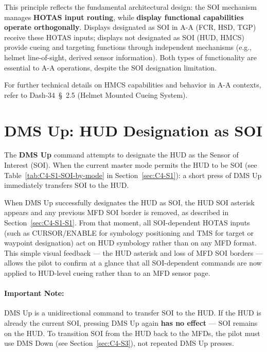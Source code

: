 \documentclass[11pt, a4paper, twoside]{report}
\providecommand{\dashref}[1]{Dash-34~\S~#1}
\begin{document}
This principle reflects the fundamental architectural design: the SOI mechanism manages \textbf{HOTAS input routing}, while \textbf{display functional capabilities operate orthogonally}. Displays designated as SOI in A-A (FCR, HSD, TGP) receive these HOTAS inputs; displays not designated as SOI (HUD, HMCS) provide cueing and targeting functions through independent mechanisms (e.g., helmet line-of-sight, derived sensor information). Both types of functionality are essential to A-A operations, despite the SOI designation limitation.

For further technical details on HMCS capabilities and behavior in A-A contexts, refer to \dashref{2.5} (Helmet Mounted Cueing System).

\section{DMS Up: HUD Designation as SOI}
\label{sec:C4-S2}

The \textbf{DMS Up} command attempts to designate the HUD as the Sensor of Interest (SOI). When the current master mode permits the HUD to be SOI (see Table~\ref{tab:C4-S1-SOI-by-mode} in Section~\ref{sec:C4-S1}): a short press of DMS Up immediately transfers SOI to the HUD.

When DMS Up successfully designates the HUD as SOI, the HUD SOI asterisk appears and any previous MFD SOI border is removed, as described in Section~\ref{sec:C4-S1-S1}. From that moment, all SOI-dependent HOTAS inputs (such as CURSOR/ENABLE for symbology positioning and TMS for target or waypoint designation) act on HUD symbology rather than on any MFD format. This simple visual feedback --- the HUD asterisk and loss of MFD SOI borders --- allows the pilot to confirm at a glance that all SOI-dependent commands are now applied to HUD-level cueing rather than to an MFD sensor page.

\paragraph*{Important Note:}

DMS Up is a unidirectional command to transfer SOI to the HUD. If the HUD is already the current SOI, pressing DMS Up again \textbf{has no effect} --- SOI remains on the HUD. To transition SOI from the HUD back to the MFDs, the pilot must use DMS Down (see Section~\ref{sec:C4-S3}), not repeated DMS Up presses.
\end{document}
